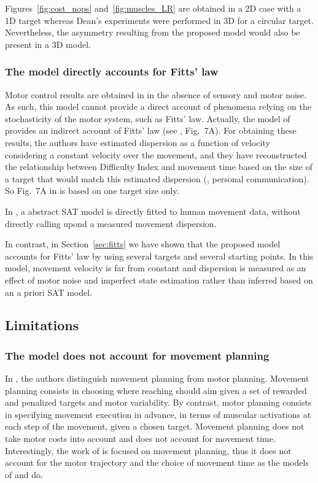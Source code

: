 \documentclass[10pt]{article}
\begin{document}
Figures~\ref{fig:cost_nops} and~\ref{fig:muscles_LR} are obtained in a 2D case with a 1D target whereas Dean's experiments were performed in 3D for a circular target. Nevertheless, the asymmetry resulting from the proposed model would also be present in a 3D model. 


\subsubsection{The model directly accounts for Fitts' law}
\label{sec:discu_fitts}
Motor control results are obtained in \cite{rigoux12} in the absence of sensory and motor noise. As such, this model cannot provide a direct account of phenomena relying on the stochasticity of the motor system, such as Fitts' law. Actually, the model of \cite{rigoux12} provides an indirect account of Fitts' law (see \cite{rigoux12}, Fig.~7A). For obtaining these results, the authors have estimated dispersion as a function of velocity considering a constant velocity over the movement, and they have reconstructed the relationship between Difficulty Index and movement time based on the size of a target that would match this estimated dispersion (\cite{rigoux12}, personal communication). So Fig.~7A in \cite{rigoux12} is based on one target size only.

In \cite{Dean2007}, a abstract SAT model is directly fitted to human movement data, without directly calling upond a measured movement dispersion.

In contrast, in Section~\ref{sec:fitts} we have shown that the proposed model accounts for Fitts' law by using several targets and several starting points. In this model, movement velocity is far from constant and dispersion is measured as an effect of motor noise and imperfect state estimation rather than inferred based on an a priori SAT model.

\subsection{Limitations}

\subsubsection{The model does not account for movement planning}
\label{sec:limitations}

In \cite{Trommershauser2003a,Trommershauser2005}, the authors distinguish movement planning from motor planning. Movement planning consists in choosing where reaching should aim given a set of rewarded and penalized targets and motor variability. By contrast, motor planning consists in specifying movement execution in advance, in terms of muscular activations at each step of the movement, given a chosen target. Movement planning does not take motor costs into account and does not account for movement time.
Interestingly, the work of \cite{Trommershauser2003a,Trommershauser2005} is focused on movement planning, thus it does not account for the motor trajectory and the choice of movement time as the models of \cite{shadmehr10} and \cite{rigoux12} do.
\end{document}
